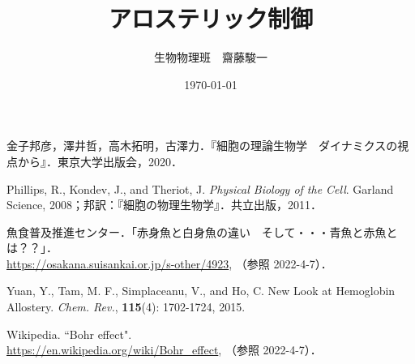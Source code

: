 \documentclass[a4paper,11pt]{jsarticle}
\begin{document}
\title{アロステリック制御}
\author{生物物理班　齋藤駿一}
\date{\today}
\maketitle

\tableofcontents









\begin{thebibliography}{99}
   金子邦彦，澤井哲，高木拓明，古澤力．『細胞の理論生物学　ダイナミクスの視点から』．東京大学出版会，2020．
  
   Phillips, R., Kondev, J., and Theriot, J. \textit{Physical Biology of the Cell}. Garland Science, 2008；邦訳：『細胞の物理生物学』．共立出版，2011．

   魚食普及推進センター．「赤身魚と白身魚の違い　そして・・・青魚と赤魚とは？？」．\\
  \url{https://osakana.suisankai.or.jp/s-other/4923}, （参照 2022-4-7）．

   Yuan, Y., Tam, M. F., Simplaceanu, V., and Ho, C. New Look at Hemoglobin Allostery. \textit{Chem. Rev.},  \textbf{115}(4): 1702-1724, 2015.

   Wikipedia. ``Bohr effect".\\
  \url{https://en.wikipedia.org/wiki/Bohr_effect}, （参照 2022-4-7）．
\end{thebibliography}
\end{document}
